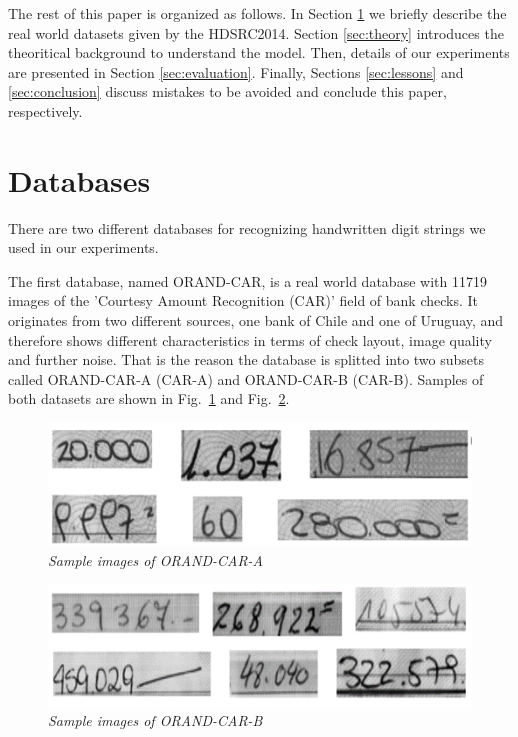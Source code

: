The rest of this paper is organized as follows. In Section \ref{Datasets} we
briefly describe the real world datasets given by the HDSRC2014. Section
\ref{sec:theory} introduces the theoritical background to understand the model.
Then, details of our experiments are presented in Section \ref{sec:evaluation}.
Finally, Sections \ref{sec:lessons} and \ref{sec:conclusion} discuss mistakes
to be avoided and conclude this paper, respectively.

\section{Databases} \label{Datasets}
There are two different databases for recognizing handwritten digit strings we used in our experiments.

The first database, named ORAND-CAR, is a real world database with 11719 images
of the 'Courtesy Amount Recognition (CAR)' field of bank checks. It originates
from two different sources, one bank of Chile and one of Uruguay, and therefore
shows different characteristics in terms of check layout, image quality and
further noise. That is the reason the database is splitted into two subsets
called ORAND-CAR-A (CAR-A) and ORAND-CAR-B (CAR-B). Samples of both datasets are
shown in Fig.~\ref{fig:carA} and Fig.~\ref{fig:carB}.

\begin{figure}
  \includegraphics[width=\linewidth]{images/CAR-A-Splitted.png}
  \caption{\it Sample images of ORAND-CAR-A}
  \label{fig:carA}
\end{figure}

\begin{figure}
  \includegraphics[width=\linewidth]{images/CAR-B-Splitted.png}
  \caption{\it Sample images of ORAND-CAR-B}
  \label{fig:carB}
\end{figure}

